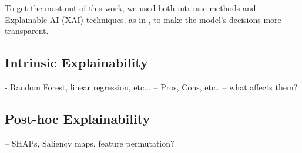 To get the most out of this work, we used both intrinsic methods and Explainable AI (XAI) techniques, as in \cite{FuentesJimnez2025}, to make the model's decisions more transparent.

\subsection{Intrinsic Explainability}\label{subsec:method-intrinsic-explainability}
- Random Forest, linear regression, etc...
-- Pros, Cons, etc..
-- what affects them?

\subsection{Post-hoc Explainability}\label{subsec:method-posthoc-explainability}
-- SHAPs, Saliency maps, feature permutation?



